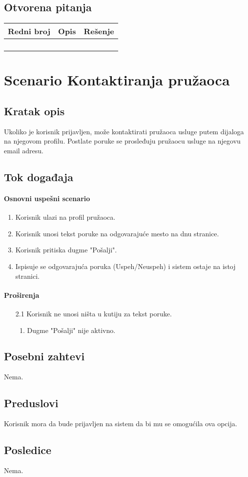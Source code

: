 \documentclass[a4paper,12pt]{report}
\newcommand{\genitivfunkcionalnosti}{Kontaktiranja pružaoca}
\begin{document}
		\subsection{Otvorena pitanja}
			\begin{tabular}{ |c|p{10cm}|l| }
				\hline
				\textbf{Redni broj} & \textbf{Opis} & \textbf{Rešenje} \\ 
				\hline
			    & &  \\
				\hline
			    &  & \\
				\hline
				&  & \\
				\hline
				&  & \\
				\hline
			\end{tabular}
	\section{Scenario \genitivfunkcionalnosti}
		\subsection{Kratak opis}
			Ukoliko je korisnik prijavljen, može kontaktirati pružaoca usluge putem dijaloga na njegovom profilu. Postlate poruke se prosleđuju pružaocu usluge na njegovu email adresu.
		\newpage
		\subsection{Tok događaja}
			\paragraph*{Osnovni uspešni scenario}
				\begin{enumerate}
					\item Korisnik ulazi na profil pružaoca.
					\item Korisnik unosi tekst poruke na odgovarajuće mesto na dnu stranice.
					\item Korisnik pritiska dugme "Pošalji".
					\item Ispisuje se odgovarajuća poruka (Uspeh/Neuspeh) i sistem ostaje na istoj stranici.
				\end{enumerate}
			\paragraph*{Proširenja}
				\begin{enumerate}
					\item[2.1] Korisnik ne unosi ništa u kutiju za tekst poruke.
						\begin{enumerate}[noitemsep,topsep=-8pt]
							\item Dugme "Pošalji" nije aktivno.
						\end{enumerate}
				\end{enumerate}
		\subsection{Posebni zahtevi}
			Nema.
		\subsection{Preduslovi}
			Korisnik mora da bude prijavljen na sistem da bi mu se omogućila ova opcija.
		\subsection{Posledice}
			Nema.
\end{document}
